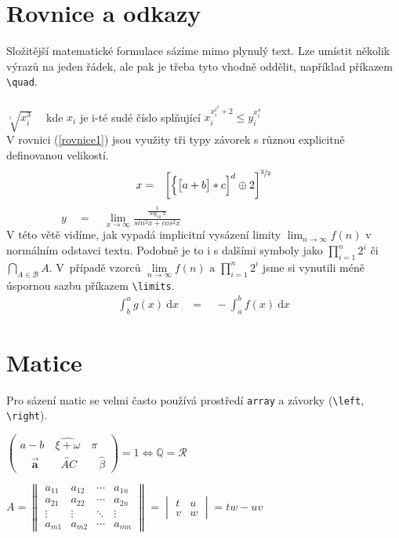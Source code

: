 \documentclass[a4paper, 11pt, twocolumn] {article}
\theoremstyle{definition}
\theoremstyle{plain}
\begin{document}
\section{Rovnice a odkazy}
Složitější matematické formulace sázíme mimo plynulý
text. Lze umístit několik výrazů na jeden řádek, ale pak je
třeba tyto vhodně oddělit, například příkazem \verb|\quad|.\\\\
$\sqrt[i]{x^3_i} \quad$ kde $x_i$ je i-té sudé číslo splňující 
$x_i^{x_i^{i^2}+ 2} \leq y_i^{x_i^4}$\\
V rovnici (\ref{rovnice1}) jsou využity tři typy závorek s různou
explicitně definovanou velikostí.\\

\begin{eqnarray}
	\label{rovnice1}
	x & = & \bigg[\Big\{\big[a + b\big]*c\Big]^d \oplus 								2\bigg]^{\sfrac{3}{2}}
\end{eqnarray}
$\quad\quad\quad\quad\quad y \quad = \quad \lim\limits_{x \to \infty} \frac{\displaystyle \frac{1}{\log_{10} x}}{\displaystyle sin^2 x + cos^2 x}$\\

V této větě vidíme, jak vypadá implicitní vysázení limity $\lim_{n\rightarrow\infty} f(n)$ v normálním odstavci textu. Podobně je to i s dalšími symboly jako $\prod\nolimits_{i=1}^{n}2^i$ či $\bigcap_{A\in\mathcal{B}} A$. V~případě vzorců $\lim\limits_{n \to \infty}f(n) \text{ a } \prod\limits_{i=1}^{n}2^i$ jsme si vynutili méně úspornou sazbu příkazem \verb|\limits|.\\
\begin{eqnarray}
	\label{rovnice2}
	\displaystyle\int_{b}^{a} g(x)\: \mathrm{d}x\quad = \quad-\int_{a}^{b} f(x)\: 	\mathrm{d}x 
\end{eqnarray}
\section{Matice}
Pro sázení matic se velmi často používá prostředí \texttt{array}
a závorky (\verb|\left|, \verb|\right|).\\
\begin{center}
$\left(\begin{array}{ccc} a-b \quad \widehat{\xi + \omega} \quad \pi \\
       \quad\vec{\mathbf{a}}\quad\quad \overleftrightarrow{AC}\quad\quad\!\! 			   \hat{\beta} \end{array}
 \right) = 1 \Longleftrightarrow \mathbb{Q} = \mathcal{R}$

$A = 
\begin{Vmatrix}
a_{11} & a_{12} & \cdots & a_{1n} \\
a_{21} & a_{22} & \cdots & a_{2n} \\
\vdots  & \vdots  & \ddots & \vdots  \\
a_{m1} & a_{m2} & \cdots & a_{mn} 
\end{Vmatrix} = 
\begin{vmatrix}
t & u\\
v & w
\end{vmatrix} = 
tw - uv$\\
\end{center}
\end{document}
